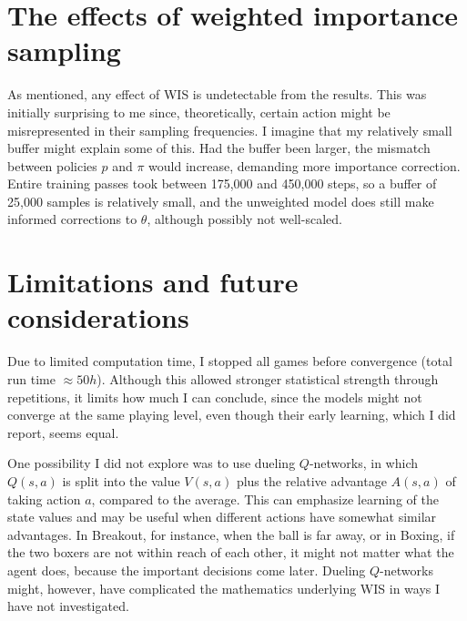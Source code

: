 \documentclass{article}
\begin{document}
\section{The effects of weighted importance sampling}
As mentioned, any effect of WIS is undetectable from the results. This was initially surprising to me since, theoretically, certain action might be misrepresented in their sampling frequencies. I imagine that my relatively small buffer might explain some of this. Had the buffer been larger, the mismatch between policies \(p\) and \(\pi\) would increase, demanding more importance correction. Entire training passes took between 175,000 and 450,000 steps, so a buffer of 25,000 samples is relatively small, and the unweighted model does still make informed corrections to \(\theta\), although possibly not well-scaled.

\section{Limitations and future considerations}
Due to limited computation time, I stopped all games before convergence (total run time \(\approx50h\)). Although this allowed stronger statistical strength through repetitions, it limits how much I can conclude, since the models might not converge at the same playing level, even though their early learning, which I did report, seems equal.

One possibility I did not explore was to use dueling \(Q\)-networks, in which \(Q(s,a)\) is split into the value \(V(s,a)\) plus the relative advantage \(A(s,a)\) of taking action \(a\), compared to the average. This can emphasize learning of the state values and may be useful when different actions have somewhat similar advantages. In Breakout, for instance, when the ball is far away, or in Boxing, if the two boxers are not within reach of each other, it might not matter what the agent does, because the important decisions come later. Dueling \(Q\)-networks might, however, have complicated the mathematics underlying WIS in ways I have not investigated.
\end{document}
